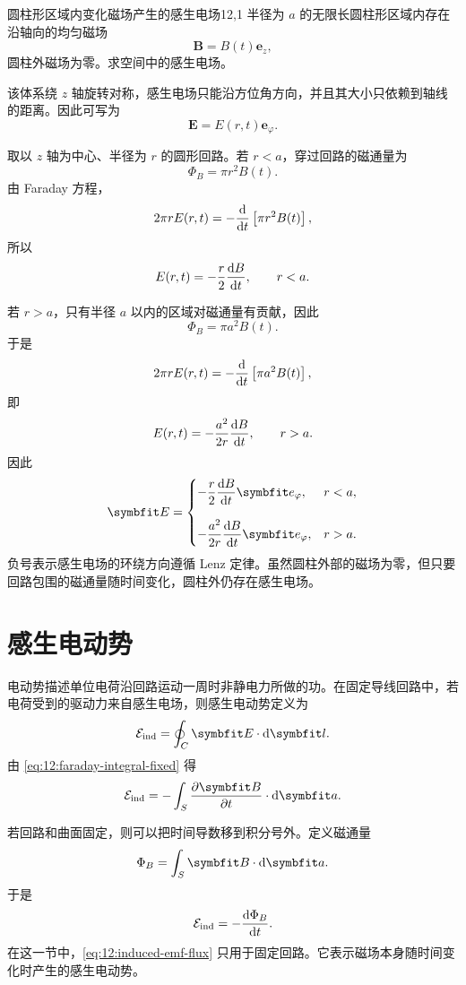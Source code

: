 \begin{example}{圆柱形区域内变化磁场产生的感生电场}{12,1}
半径为 $a$ 的无限长圆柱形区域内存在沿轴向的均匀磁场
\[
\bm{B}=B(t)\bm{e}_{z},
\]
圆柱外磁场为零。求空间中的感生电场。

\begin{solution}
该体系绕 $z$ 轴旋转对称，感生电场只能沿方位角方向，并且其大小只依赖到轴线的距离。因此可写为
\[
\bm{E}=E(r,t)\bm{e}_{\varphi}.
\]

取以 $z$ 轴为中心、半径为 $r$ 的圆形回路。若 $r<a$，穿过回路的磁通量为
\[
\Phi_{B}=\pi r^{2}B(t).
\]
由 Faraday 方程，
\[
2\pi rE(r,t)
=
-\frac{\mathop{}\!\mathrm{d}}{\mathop{}\!\mathrm{d} t}\left[\pi r^{2}B(t)\right],
\]
所以
\[
E(r,t)
=
-\frac{r}{2}\frac{\mathop{}\!\mathrm{d} B}{\mathop{}\!\mathrm{d} t},
\qquad
r<a.
\]

若 $r>a$，只有半径 $a$ 以内的区域对磁通量有贡献，因此
\[
\Phi_{B}=\pi a^{2}B(t).
\]
于是
\[
2\pi rE(r,t)
=
-\frac{\mathop{}\!\mathrm{d}}{\mathop{}\!\mathrm{d} t}\left[\pi a^{2}B(t)\right],
\]
即
\[
E(r,t)
=
-\frac{a^{2}}{2r}\frac{\mathop{}\!\mathrm{d} B}{\mathop{}\!\mathrm{d} t},
\qquad
r>a.
\]
因此
\[
\bm{E}
=
\begin{dcases}
-\dfrac{r}{2}\dfrac{\dif B}{\dif t}\bm{e}_{\varphi},
& r<a,\\[8pt]
-\dfrac{a^{2}}{2r}\dfrac{\dif B}{\dif t}\bm{e}_{\varphi},
& r>a.
\end{dcases}
\]
负号表示感生电场的环绕方向遵循 Lenz 定律。虽然圆柱外部的磁场为零，但只要回路包围的磁通量随时间变化，圆柱外仍存在感生电场。
\end{solution}
\end{example}

\section{感生电动势}

电动势描述单位电荷沿回路运动一周时非静电力所做的功。在固定导线回路中，若电荷受到的驱动力来自感生电场，则感生电动势定义为
\begin{equation}
	\mathcal{E}_{\mathrm{ind}}
	=
	\oint_{C}\bm{E}\cdot\dif\bm{l}.
	\label{eq:12:induced-emf-definition}
\end{equation}
由 \eqref{eq:12:faraday-integral-fixed} 得
\begin{equation}
	\mathcal{E}_{\mathrm{ind}}
	=
	-\int_{S}
	\frac{\partial\bm{B}}{\partial t}
	\cdot\dif\bm{a}.
	\label{eq:12:induced-emf-partial-b}
\end{equation}

若回路和曲面固定，则可以把时间导数移到积分号外。定义磁通量
\[
\Phi_{B}
=
\int_{S}
\bm{B}\cdot\dif\bm{a}.
\]
于是
\begin{equation}
	\mathcal{E}_{\mathrm{ind}}
	=
	-\frac{\mathop{}\!\mathrm{d} \Phi_{B}}{\mathop{}\!\mathrm{d} t}.
	\label{eq:12:induced-emf-flux}
\end{equation}
在这一节中，\eqref{eq:12:induced-emf-flux} 只用于固定回路。它表示磁场本身随时间变化时产生的感生电动势。

